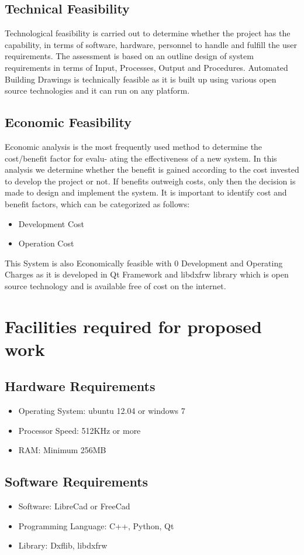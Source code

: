 \subsection{Technical Feasibility}
\noindent Technological feasibility is carried out to determine whether the project has the capability, in terms
of software, hardware, personnel to handle and fulfill the user requirements. The assessment is based
on an outline design of system requirements in terms of Input, Processes, Output and Procedures.
Automated Building Drawings is technically feasible as it is built up using various open source technologies and it can run on any platform.
\subsection{Economic Feasibility}
\noindent Economic analysis is the most frequently used method to determine the cost/benefit factor for evalu-
ating the effectiveness of a new system. In this analysis we determine whether the benefit is gained
according to the cost invested to develop the project or not. If benefits outweigh costs, only then
the decision is made to design and implement the system. It is important to identify cost and benefit
factors, which can be categorized as follows:
\begin{itemize}
\item Development Cost
\item Operation Cost
\end{itemize}
This System is also Economically feasible with 0 Development and Operating Charges
as it is developed in Qt Framework and libdxfrw library which is open source technology and is available free of cost on the internet.

\section{Facilities required for proposed work}
\subsection{Hardware Requirements}
\begin{itemize}
\item Operating System: ubuntu 12.04 or windows 7
\item Processor Speed: 512KHz or more
\item RAM: Minimum 256MB
\end{itemize}
\subsection{Software Requirements}
\begin{itemize}
\item Software: LibreCad or FreeCad
\item Programming Language: C++, Python, Qt
\item Library: Dxflib, libdxfrw
\end{itemize}

